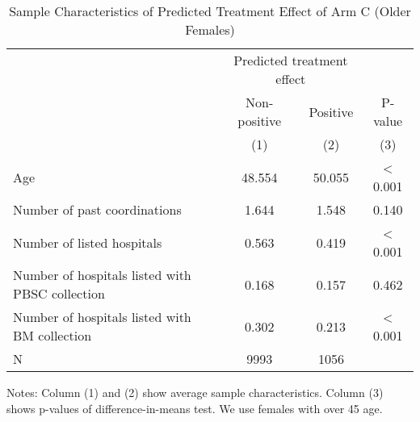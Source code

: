\documentclass[
  lualatex,
  11pt,
  a4paper
]{article}
\begin{document}
\begin{table}[H]

\caption{\label{tab:rcf-older-female}Sample Characteristics of Predicted Treatment Effect of Arm C (Older Females)}
\centering
\fontsize{9}{11}\selectfont
\fontsize{9}{11}\selectfont
\begin{threeparttable}
\begin{tabular}[t]{lccc}
\toprule
\multicolumn{1}{c}{ } & \multicolumn{2}{c}{Predicted treatment effect} & \multicolumn{1}{c}{ } \\
\cmidrule(l{3pt}r{3pt}){2-3}
\multicolumn{1}{c}{ } & \multicolumn{1}{c}{Non-positive} & \multicolumn{1}{c}{Positive} & \multicolumn{1}{c}{P-value} \\
\cmidrule(l{3pt}r{3pt}){2-2} \cmidrule(l{3pt}r{3pt}){3-3} \cmidrule(l{3pt}r{3pt}){4-4}
 & (1) & (2) & (3)\\
\midrule
Age & 48.554 & 50.055 & < 0.001\\
Number of past coordinations & 1.644 & 1.548 & 0.140\\
Number of listed hospitals & 0.563 & 0.419 & < 0.001\\
Number of hospitals listed with PBSC collection & 0.168 & 0.157 & 0.462\\
Number of hospitals listed with BM collection & 0.302 & 0.213 & < 0.001\\
N & 9993 & 1056 & \\
\bottomrule
\end{tabular}
\begin{tablenotes}
\item Notes: Column (1) and (2) show average sample characteristics. Column (3) shows p-values of difference-in-means test. We use females with over 45 age.
\end{tablenotes}
\end{threeparttable}
\end{table}

\clearpage

\clearpage


\end{document}
